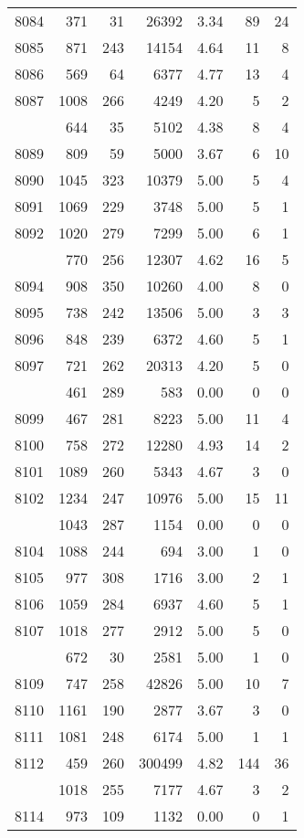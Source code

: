 \documentclass[
]{article}
\begin{document}
\begin{table}
\begin{tabular}[t]{lrrrrrr}
8084 & 371 & 31 & 26392 & 3.34 & 89 & 24\\
8085 & 871 & 243 & 14154 & 4.64 & 11 & 8\\
8086 & 569 & 64 & 6377 & 4.77 & 13 & 4\\
8087 & 1008 & 266 & 4249 & 4.20 & 5 & 2\\
\addlinespace
8088 & 644 & 35 & 5102 & 4.38 & 8 & 4\\
8089 & 809 & 59 & 5000 & 3.67 & 6 & 10\\
8090 & 1045 & 323 & 10379 & 5.00 & 5 & 4\\
8091 & 1069 & 229 & 3748 & 5.00 & 5 & 1\\
8092 & 1020 & 279 & 7299 & 5.00 & 6 & 1\\
\addlinespace
8093 & 770 & 256 & 12307 & 4.62 & 16 & 5\\
8094 & 908 & 350 & 10260 & 4.00 & 8 & 0\\
8095 & 738 & 242 & 13506 & 5.00 & 3 & 3\\
8096 & 848 & 239 & 6372 & 4.60 & 5 & 1\\
8097 & 721 & 262 & 20313 & 4.20 & 5 & 0\\
\addlinespace
8098 & 461 & 289 & 583 & 0.00 & 0 & 0\\
8099 & 467 & 281 & 8223 & 5.00 & 11 & 4\\
8100 & 758 & 272 & 12280 & 4.93 & 14 & 2\\
8101 & 1089 & 260 & 5343 & 4.67 & 3 & 0\\
8102 & 1234 & 247 & 10976 & 5.00 & 15 & 11\\
\addlinespace
8103 & 1043 & 287 & 1154 & 0.00 & 0 & 0\\
8104 & 1088 & 244 & 694 & 3.00 & 1 & 0\\
8105 & 977 & 308 & 1716 & 3.00 & 2 & 1\\
8106 & 1059 & 284 & 6937 & 4.60 & 5 & 1\\
8107 & 1018 & 277 & 2912 & 5.00 & 5 & 0\\
\addlinespace
8108 & 672 & 30 & 2581 & 5.00 & 1 & 0\\
8109 & 747 & 258 & 42826 & 5.00 & 10 & 7\\
8110 & 1161 & 190 & 2877 & 3.67 & 3 & 0\\
8111 & 1081 & 248 & 6174 & 5.00 & 1 & 1\\
8112 & 459 & 260 & 300499 & 4.82 & 144 & 36\\
\addlinespace
8113 & 1018 & 255 & 7177 & 4.67 & 3 & 2\\
8114 & 973 & 109 & 1132 & 0.00 & 0 & 1\\

\end{tabular}
\end{table}
\end{document}
